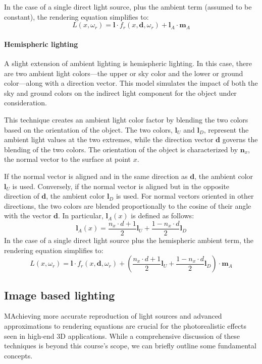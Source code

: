 In the case of a single direct light source, plus the ambient term (assumed to be constant), the rendering equation simplifies to:
\[L(x,\omega_r)=\mathbf{l}\cdot f_r(x,\mathbf{d},\omega_r)+\mathbf{l}_A\cdot\mathbf{m}_A\]

\paragraph*{Hemispheric lighting}
A slight extension of ambient lighting is hemispheric lighting. 
In this case, there are two ambient light colors—the upper or sky color and the lower or ground color—along with a direction vector. 
This model simulates the impact of both the sky and ground colors on the indirect light component for the object under consideration.

This technique creates an ambient light color factor by blending the two colors based on the orientation of the object. 
The two colors, $\mathbf{l}_U$ and $\mathbf{l}_D$, represent the ambient light values at the two extremes, while the direction vector $\mathbf{d}$ governs the blending of the two colors. 
The orientation of the object is characterized by $\mathbf{n}_x$, the normal vector to the surface at point $x$.

If the normal vector is aligned and in the same direction as $\mathbf{d}$, the ambient color $\mathbf{l}_U$ is used. 
Conversely, if the normal vector is aligned but in the opposite direction of $\mathbf{d}$, the ambient color $\mathbf{l}_D$ is used. 
For normal vectors oriented in other directions, the two colors are blended proportionally to the cosine of their angle with the vector $\mathbf{d}$.
In particular, $\mathbf{l}_A(x)$ is defined as follows:
\[\mathbf{l}_A(x)=\dfrac{n_x\cdot d+1}{2}\mathbf{l}_U+\dfrac{1-n_x\cdot d}{2}\mathbf{l}_D\]
In the case of a single direct light source plus the hemispheric ambient term, the rendering equation simplifies to:
\[L(x,\omega_r)=\mathbf{l}\cdot f_r(x,\mathbf{d},\omega_r)+\left(\dfrac{n_x\cdot d+1}{2}\mathbf{l}_U+\dfrac{1-n_x\cdot d}{2}\mathbf{l}_D\right)\cdot\mathbf{m}_A\]

\subsection{Image based lighting}
MAchieving more accurate reproduction of light sources and advanced approximations to rendering equations are crucial for the photorealistic effects seen in high-end 3D applications. 
While a comprehensive discussion of these techniques is beyond this course's scope, we can briefly outline some fundamental concepts.


